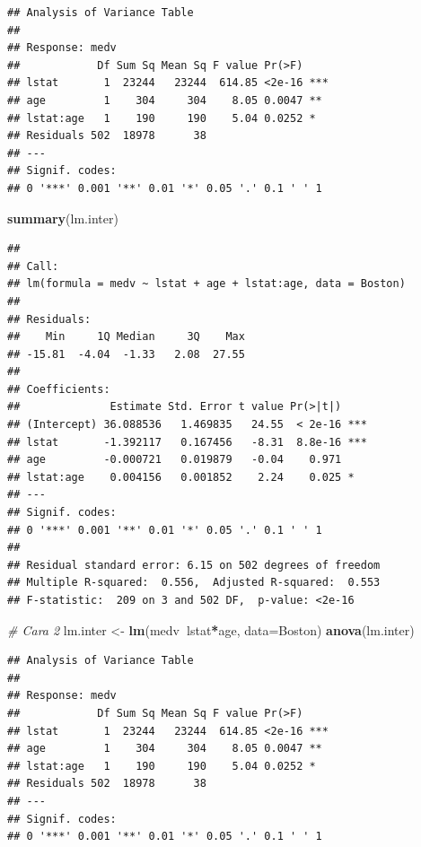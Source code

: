 \documentclass[]{book}
\newenvironment{Shaded}{\begin{snugshade}}{\end{snugshade}}
\newcommand{\CommentTok}[1]{\textcolor[rgb]{0.56,0.35,0.01}{\textit{#1}}}
\newcommand{\DataTypeTok}[1]{\textcolor[rgb]{0.13,0.29,0.53}{#1}}
\newcommand{\KeywordTok}[1]{\textcolor[rgb]{0.13,0.29,0.53}{\textbf{#1}}}
\newcommand{\NormalTok}[1]{#1}
\newcommand{\OperatorTok}[1]{\textcolor[rgb]{0.81,0.36,0.00}{\textbf{#1}}}
\newcommand{\StringTok}[1]{\textcolor[rgb]{0.31,0.60,0.02}{#1}}
\theoremstyle{definition}
\theoremstyle{definition}
\theoremstyle{definition}
\theoremstyle{remark}
\begin{document}
\begin{verbatim}
## Analysis of Variance Table
## 
## Response: medv
##            Df Sum Sq Mean Sq F value Pr(>F)    
## lstat       1  23244   23244  614.85 <2e-16 ***
## age         1    304     304    8.05 0.0047 ** 
## lstat:age   1    190     190    5.04 0.0252 *  
## Residuals 502  18978      38                   
## ---
## Signif. codes:  
## 0 '***' 0.001 '**' 0.01 '*' 0.05 '.' 0.1 ' ' 1
\end{verbatim}

\begin{Shaded}
\begin{Highlighting}[]
\KeywordTok{summary}\NormalTok{(lm.inter)}
\end{Highlighting}
\end{Shaded}

\begin{verbatim}
## 
## Call:
## lm(formula = medv ~ lstat + age + lstat:age, data = Boston)
## 
## Residuals:
##    Min     1Q Median     3Q    Max 
## -15.81  -4.04  -1.33   2.08  27.55 
## 
## Coefficients:
##              Estimate Std. Error t value Pr(>|t|)    
## (Intercept) 36.088536   1.469835   24.55  < 2e-16 ***
## lstat       -1.392117   0.167456   -8.31  8.8e-16 ***
## age         -0.000721   0.019879   -0.04    0.971    
## lstat:age    0.004156   0.001852    2.24    0.025 *  
## ---
## Signif. codes:  
## 0 '***' 0.001 '**' 0.01 '*' 0.05 '.' 0.1 ' ' 1
## 
## Residual standard error: 6.15 on 502 degrees of freedom
## Multiple R-squared:  0.556,  Adjusted R-squared:  0.553 
## F-statistic:  209 on 3 and 502 DF,  p-value: <2e-16
\end{verbatim}

\begin{Shaded}
\begin{Highlighting}[]
\CommentTok{# Cara 2}
\NormalTok{lm.inter <-}\StringTok{ }\KeywordTok{lm}\NormalTok{(medv}\OperatorTok{~}\NormalTok{lstat}\OperatorTok{*}\NormalTok{age, }\DataTypeTok{data=}\NormalTok{Boston)}
\KeywordTok{anova}\NormalTok{(lm.inter)}
\end{Highlighting}
\end{Shaded}

\begin{verbatim}
## Analysis of Variance Table
## 
## Response: medv
##            Df Sum Sq Mean Sq F value Pr(>F)    
## lstat       1  23244   23244  614.85 <2e-16 ***
## age         1    304     304    8.05 0.0047 ** 
## lstat:age   1    190     190    5.04 0.0252 *  
## Residuals 502  18978      38                   
## ---
## Signif. codes:  
## 0 '***' 0.001 '**' 0.01 '*' 0.05 '.' 0.1 ' ' 1
\end{verbatim}
\end{document}
